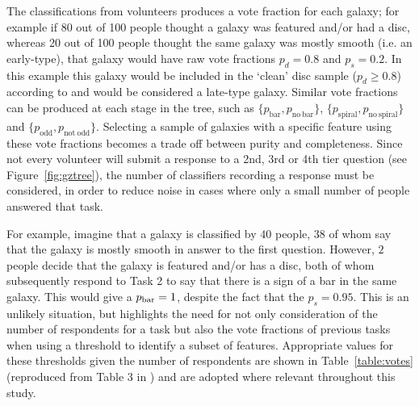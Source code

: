 
The classifications from volunteers produces a vote fraction for each galaxy; for example if 80 out of 100 people thought a galaxy was featured and/or had a disc, whereas 20 out of 100 people thought the same galaxy was mostly smooth (i.e. {\minor an early-type}), that galaxy would have raw vote fractions $p_{d} = 0.8$ and $p_{s} = 0.2$. In this example this galaxy would be included in the `clean' disc sample ($p_d \geq 0.8$) according to \cite{GZ2} and would be considered a late-type galaxy. Similar vote fractions can be produced at each stage in the tree, such as $\{p_{\mathrm{bar}}, p_{\mathrm{no~bar}}\}$, $\{p_{\mathrm{spiral}}, p_{\mathrm{no~spiral}}\}$ and $\{p_{\mathrm{odd}}, p_{\mathrm{not~odd}}\}$. Selecting a sample of galaxies with a specific feature using these vote fractions becomes a trade off between purity and completeness. Since not every volunteer will submit a response to a 2nd, 3rd or 4th tier question (see Figure~\ref{fig:gztree}), the number of classifiers recording a response must be considered, in order to reduce noise in cases where only a small number of people answered that task. 

For example, imagine that a galaxy is classified by $40$ people, $38$ of whom say that the galaxy is mostly smooth in answer to the first question. However, $2$ people decide that the galaxy is featured and/or has a disc, both of whom subsequently respond to Task 2 to say that there is a sign of a bar in the same galaxy. This would give a $p_{\rm{bar}}=1$, despite the fact that the $p_s = 0.95$. This is an unlikely situation, but highlights the need for not only consideration of the number of respondents for a task but also the vote fractions of previous tasks when using a threshold to identify a subset of features. Appropriate values for these thresholds given the number of respondents are shown in Table~\ref{table:votes} (reproduced from Table 3 in \citealt{GZ2}) and are adopted where relevant throughout this study. 


